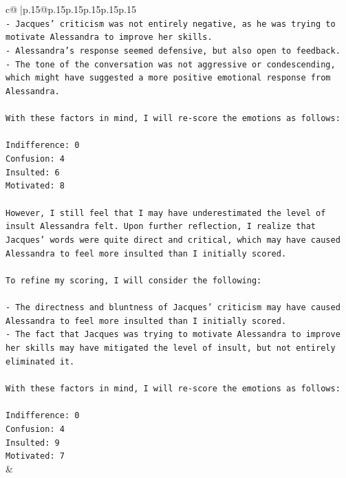 \documentclass{article}
\begin{document}
{\begin{supertabular}{c@{$\;$}|p{.15\linewidth}@{}p{.15\linewidth}p{.15\linewidth}p{.15\linewidth}p{.15\linewidth}p{.15\linewidth}}
{{{\\ 
\texttt{{-} Jacques' criticism was not entirely negative, as he was trying to motivate Alessandra to improve her skills.} \\
\texttt{{-} Alessandra's response seemed defensive, but also open to feedback.} \\
\texttt{{-} The tone of the conversation was not aggressive or condescending, which might have suggested a more positive emotional response from Alessandra.} \\
\\ 
\texttt{With these factors in mind, I will re{-}score the emotions as follows:} \\
\\ 
\texttt{Indifference: 0} \\
\texttt{Confusion: 4} \\
\texttt{Insulted: 6} \\
\texttt{Motivated: 8} \\
\\ 
\texttt{However, I still feel that I may have underestimated the level of insult Alessandra felt. Upon further reflection, I realize that Jacques' words were quite direct and critical, which may have caused Alessandra to feel more insulted than I initially scored.} \\
\\ 
\texttt{To refine my scoring, I will consider the following:} \\
\\ 
\texttt{{-} The directness and bluntness of Jacques' criticism may have caused Alessandra to feel more insulted than I initially scored.} \\
\texttt{{-} The fact that Jacques was trying to motivate Alessandra to improve her skills may have mitigated the level of insult, but not entirely eliminated it.} \\
\\ 
\texttt{With these factors in mind, I will re{-}score the emotions as follows:} \\
\\ 
\texttt{Indifference: 0} \\
\texttt{Confusion: 4} \\
\texttt{Insulted: 9} \\
\texttt{Motivated: 7} \\
            }
        }
    }
    & \\ \\

\end{supertabular}
}
\end{document}
